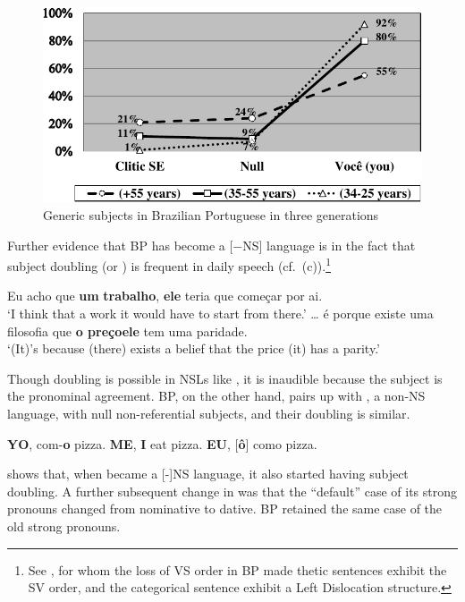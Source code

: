 \documentclass[output=paper]{langsci/langscibook}
\begin{document}
\begin{figure}[htpb]
    \centering
    \includegraphics[width=.75\linewidth]{./img/fig3.pdf}
    \caption{Generic subjects in Brazilian Portuguese in three
    generations}\label{fig:key:26.3}
\end{figure}

Further evidence that \gls{BP} has become a [−NS]
language is in the fact that subject doubling (or ) is frequent
in daily speech (cf.\ (c)).\footnote{See \citet{Britto2000}, for whom the loss
    of VS order in \gls{BP} made thetic sentences
    exhibit the SV order, and the categorical sentence exhibit a Left
Dislocation structure.}\newpage

\ea%
    \label{ex:key:26.45}
    \ea Eu acho que \textbf{um} \textbf{trabalho}\textbf{}, \textbf{ele}\textbf{} teria que começar por ai.\\
    \enquote*{I think that a work it would have to start from there.}
    \ex \dots{} é porque    existe uma filosofia que \textbf{o preço}\textbf{}\textbf{ele}\textbf{} tem uma paridade.\\
    \enquote*{(It)’s because (there) exists a belief     that the price (it) has a parity.}
    \z
\z

Though doubling is possible in \gls{NSL}s like , it is inaudible because
the subject is the pronominal agreement. \gls{BP}, on
the other hand, pairs up with  , a non-NS language, with null
non-referential subjects, and their doubling is similar.

\ea%
    \label{ex:key:26.46}
    \ea \textbf{YO},  com-\textbf{o}  pizza.
    \ex \textbf{ME}, \textbf{I} eat  pizza.
    \ex \textbf{EU}, [\textbf{ô}] como pizza.
    \z
\z

\citet{Roberts1993b} shows that, when  became a [-]NS language, it
also started having subject doubling. A further subsequent change in
 was that the “default” case of its strong pronouns changed from
nominative to dative. \gls{BP} retained the same case
of the old strong pronouns.
\end{document}
